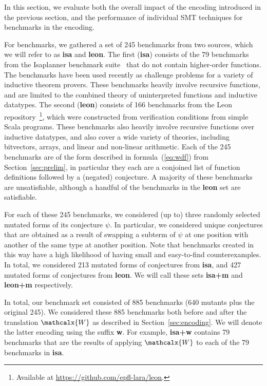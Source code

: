 \documentclass[runningheads,a4paper]{llncs}
\newcommand{\conv}{\mathcalx{W}}
\begin{document}
In this section, we evaluate both 
the overall impact of the encoding introduced in the previous section, and
the performance of individual SMT techniques for benchmarks in the encoding.

For benchmarks, we gathered a set of 245 benchmarks from two sources, which we will refer to as {\bf isa} and {\bf leon}.
The first ({\bf isa}) consists of the 79 benchmarks from the Isaplanner benchmark suite~\cite{DBLP:conf/itp/JohanssonDB10} that do not contain higher-order functions.
The benchmarks have been used recently as challenge problems for a variety of inductive theorem provers.
These benchmarks heavily involve recursive functions, and are limited to the combined theory of uninterpreted functions and inductive datatypes.
The second ({\bf leon}) consists of 166 benchmarks from the Leon repository~\footnote{Available at \url{https://github.com/epfl-lara/leon}.},
which were constructed from verification conditions from simple Scala programs.
These benchmarks also heavily involve recursive functions over inductive datatypes, 
and also cover a wide variety of theories, including bitvectors, arrays, and linear and non-linear arithmetic.
Each of the 245 benchmarks are of the form described in formula~(\ref{eq:wdf}) from Section~\ref{sec:prelim},
in particular they each are a conjoined list of function definitions followed by a (negated) conjecture.
A majority of these benchmarks are unsatisfiable, although a handful of the benchmarks in the {\bf leon} set are satisfiable.

For each of these 245 benchmarks, we considered (up to) three randomly selected mutated forms of its conjecture $\psi$.
In particular, we considered unique conjectures that are obtained as a result of swapping a subterm of $\psi$ at one position
with another of the same type at another position.
Note that benchmarks created in this way have a high likelihood of having small and easy-to-find counterexamples.
In total, we considered 213 mutated forms of conjectures from {\bf isa}, and 427 mutated forms of conjectures from {\bf leon}.
We will call these sets {\bf isa+m} and {\bf leon+m} respectively.

In total, our benchmark set consisted of 885 benchmarks (640 mutants plus the original 245).
We considered these 885 benchmarks both before and after the translation $\conv$ as described in Section~\ref{sec:encoding}.
We will denote the latter encoding using the suffix {\bf w}.
For example, {\bf isa+w} contains 79 benchmarks that are the results of
applying $\conv$ to each of the 79 benchmarks in {\bf isa}.
\end{document}
